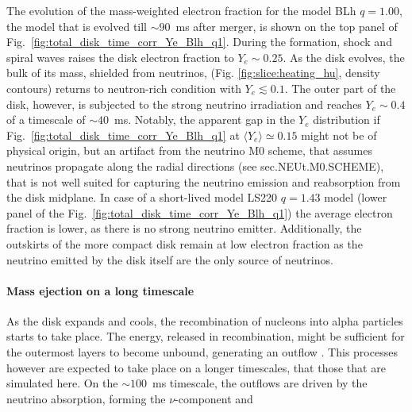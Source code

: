 \documentclass[11pt,a4paper,headinclude=true,DIV=14,BCOR=8mm,chapterprefix,listof=totoc,twoside,openright,abstracton]{scrbook}
\newcommand{\nwind}{$\nu$-component}
\begin{document}
The evolution of the mass-weighted electron fraction for the model
BLh $q=1.00$, the model that is evolved till $\sim 90$~ms after merger, 
is shown on the top panel of Fig.~\ref{fig:total_disk_time_corr_Ye_Blh_q1}.
During the formation, shock and spiral waves raises the disk electron fraction to
$Y_e\sim0.25$. As the disk evolves, the bulk of its mass, shielded from neutrinos, 
(Fig. \ref{fig:slice:heating_hu}, density contours) 
returns to neutron-rich condition with $Y_e\lesssim0.1$. 
The outer part of the disk, however, is subjected to the 
strong neutrino irradiation and reaches $Y_e\sim0.4$ of a timescale of ${\sim}40$~ms.
Notably, the apparent gap in the $Y_e$ distribution if Fig.~\ref{fig:total_disk_time_corr_Ye_Blh_q1} at $\langle Y_e \rangle \simeq 0.15$ 
might not be of physical origin, but an artifact from the neutrino M0 scheme, 
that assumes neutrinos propagate along the radial directions
(see sec.NEUt.M0.SCHEME), that is not well suited for capturing the 
neutrino emission and reabsorption from the disk midplane.
In case of a short-lived model LS220 $q=1.43$ model 
(lower panel of the Fig.~\ref{fig:total_disk_time_corr_Ye_Blh_q1})
the average electron fraction is lower, as there is no strong neutrino 
emitter. Additionally, the outskirts of the more compact disk remain 
at low electron fraction as the neutrino emitted by the disk itself 
are the only source of neutrinos. 

\paragraph{Mass ejection on a long timescale}

As the disk expands and cools, the recombination of nucleons into 
alpha particles starts to take place.
The energy, released in recombination, might be sufficient for the outermost 
layers to become unbound, generating an outflow 
\citep{Beloborodov:2008nx,Lee:2009uc,Fernandez:2013tya}.
This processes however are expected to take place on a longer timescales,
that those that are simulated here.
On the $\sim100$~ms timescale, the outflows are driven by the neutrino absorption,
forming the \nwind{} \citealt{Dessart:2008zd,Perego:2014fma,Just:2014fka} 
and 
\end{document}

